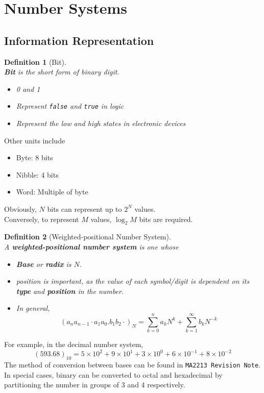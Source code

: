 \documentclass[12pt]{article}
\newtheorem{definition}{Definition}[section]
\theoremstyle{definition}
\begin{document}
\section{Number Systems}
\subsection{Information Representation}
\begin{definition}[Bit]
\hfill\\\normalfont \textbf{Bit} is the short form of \textit{bi}nary digi\textit{t}.
\begin{itemize}
  \item 0 and 1
  \item Represent \texttt{false} and \texttt{true} in logic
  \item Represent the \textit{low} and \textit{high} states in electronic devices
\end{itemize}
\end{definition}
Other units include
\begin{itemize}
  \item Byte: 8 bits
  \item Nibble: 4 bits
  \item Word: Multiple of byte
\end{itemize}
Obviously, $N$ bits can represent up to $2^N$ values.\\
Conversely, to represent $M$ values, $\log_2 M$ bits are required.
\begin{definition}[Weighted-positional Number System]
\hfill\\\normalfont A \textbf{weighted-positional number system} is one whose
\begin{itemize}
  \item \textbf{Base} or \textbf{radix} is $N$.
  \item position is important, as the value of each symbol/digit is dependent on its \textbf{type} and \textbf{position} in the number.
  \item In general, 
  \[
(a_na_{n-1}\cdot a_1a_0.b_1b_2\cdot)_N = \sum_{k= 0}^n a_kN^k + \sum_{k=1}^\infty b_kN^{-k}
  \]
\end{itemize}
\end{definition}
For example, in the decimal number system, 
\[
(593.68)_{10} = 5\times 10^2 + 9\times 10^1 +3\times 10^0+6\times 10^{-1}+8\times 10^{-2}
\]
The method of conversion between bases can be found in \texttt{MA2213 Revision Note}.\\
In special cases, binary can be converted to octal and hexadecimal by partitioning the number in groups of 3 and 4 respectively.
\end{document}
